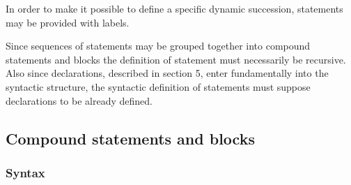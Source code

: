 \documentclass[a4paper,11pt]{article}
\begin{document}
In order to make it possible to define a specific dynamic succession,
statements may be provided with labels.

Since sequences of statements may be grouped together into compound
statements and blocks the definition of statement must necessarily be
recursive.  Also since declarations, described in section 5, enter
fundamentally into the syntactic structure, the syntactic definition
of statements must suppose declarations to be already defined.



\subsection{Compound statements and blocks}


\subsubsection{Syntax}
\label{LblCompoundStatementsSyntax}
\end{document}
